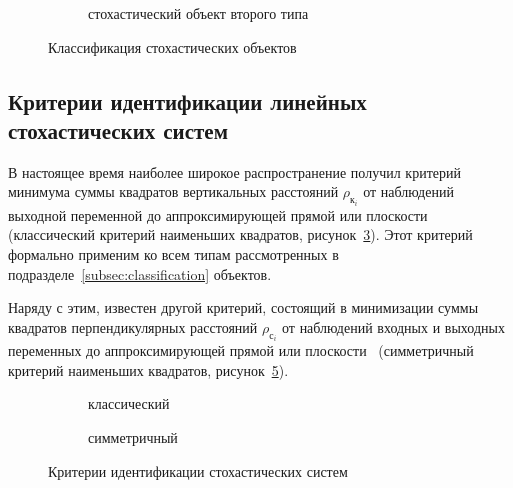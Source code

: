 \begin{figure}[p]
  \vspace{2\baselineskip}
  \begin{subfigure}[b]{\linewidth}
    \centering
    \caption{стохастический объект второго типа}\label{fig:type_second}
  \end{subfigure}

  \vspace{\baselineskip}
  \caption{Классификация стохастических объектов}
\end{figure}

\subsection{Критерии идентификации линейных стохастических систем}
\label{ssec:state_criterion}

В настоящее время наиболее широкое распространение получил критерий
минимума суммы квадратов вертикальных расстояний \( \rho_{\text{к}_i} \)
от наблюдений выходной переменной до аппроксимирующей прямой или плоскости
(классический критерий наименьших квадратов, рисунок~\ref{fig:state_criteria_classic}).
Этот критерий формально применим ко всем типам рассмотренных в
подразделе~\ref{subsec:classification} объектов.

Наряду с этим, известен другой критерий, состоящий в минимизации суммы квадратов
перпендикулярных расстояний \( \rho_{\text{с}_i} \) от наблюдений входных и выходных переменных до
аппроксимирующей прямой или плоскости~\cite{pearson_1901, mukha_2016}
(симметричный критерий наименьших квадратов, рисунок~\ref{fig:state_criteria_symmetric}).

\begin{figure}[h]
  \begin{subfigure}[b]{0.5\linewidth}
    \centering
    \caption{классический}\label{fig:state_criteria_classic}
  \end{subfigure}
  \hfill
  \begin{subfigure}[b]{0.5\linewidth}
    \centering
    \caption{симметричный}\label{fig:state_criteria_symmetric}
  \end{subfigure}

  \vspace{\baselineskip}
  \caption{Критерии идентификации стохастических систем}
\end{figure}

